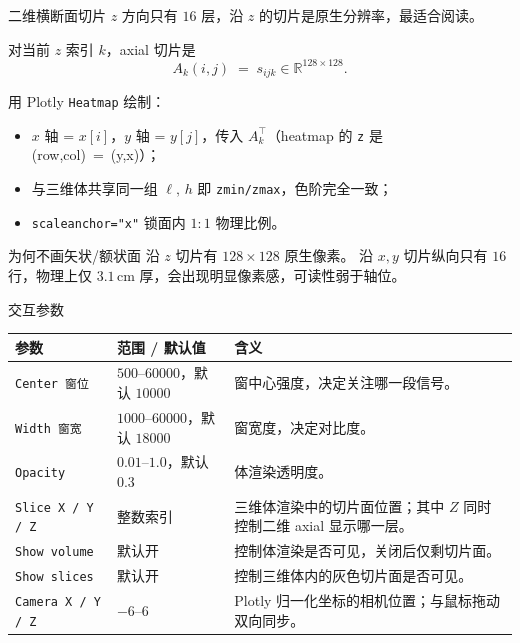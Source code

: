\documentclass[aspectratio=169,11pt]{ctexbeamer}
\newcommand{\R}{\mathbb R}
\begin{document}
\begin{frame}{二维横断面切片}
  \small
  $z$ 方向只有 $16$ 层，沿 $z$ 的切片是原生分辨率，最适合阅读。

  对当前 $z$ 索引 $k$，axial 切片是
  \[
    A_k(i,j)\;=\;s_{ijk}\in\R^{128\times128}.
  \]

  用 Plotly \texttt{Heatmap} 绘制：
  \begin{itemize}
    \item $x$ 轴 = $x[i]$，$y$ 轴 = $y[j]$，传入 $A_k^{\top}$（heatmap 的 \texttt{z} 是 \mbox{(row,col) = (y,x)}）；
    \item 与三维体共享同一组 $\ell,\,h$ 即 \texttt{zmin/zmax}，色阶完全一致；
    \item \texttt{scaleanchor="x"} 锁面内 $1{:}1$ 物理比例。
  \end{itemize}

  \begin{block}{为何不画矢状/额状面}
    沿 $z$ 切片有 $128\times 128$ 原生像素。
    沿 $x,y$ 切片纵向只有 $16$ 行，物理上仅 $3.1\,\mathrm{cm}$ 厚，会出现明显像素感，可读性弱于轴位。
  \end{block}
\end{frame}

\begin{frame}{交互参数}
  \scriptsize
  \begin{tabularx}{\linewidth}{l l X}
    \toprule
    参数 & 范围 / 默认值 & 含义 \\
    \midrule
    \texttt{Center 窗位} & $500$--$60000$，默认 $10000$ &
    窗中心强度，决定关注哪一段信号。 \\
    \texttt{Width 窗宽}  & $1000$--$60000$，默认 $18000$ &
    窗宽度，决定对比度。 \\
    \texttt{Opacity}     & $0.01$--$1.0$，默认 $0.3$ &
    体渲染透明度。 \\
    \texttt{Slice X / Y / Z} & 整数索引 &
    三维体渲染中的切片面位置；其中 $Z$ 同时控制二维 axial 显示哪一层。\\
    \texttt{Show volume} & 默认开 &
    控制体渲染是否可见，关闭后仅剩切片面。\\
    \texttt{Show slices} & 默认开 &
    控制三维体内的灰色切片面是否可见。\\
    \texttt{Camera X / Y / Z} & $-6$--$6$ &
    Plotly 归一化坐标的相机位置；与鼠标拖动双向同步。\\
    \bottomrule
  \end{tabularx}
\end{frame}
\end{document}
